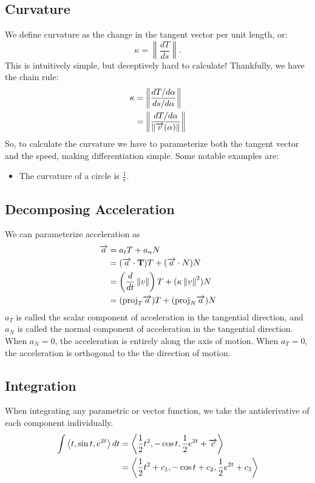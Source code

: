 \documentclass[12pt]{article}
\theoremstyle{plain} %
\theoremstyle{definition}
\theoremstyle{definition}
\theoremstyle{definition}
\theoremstyle{remark}
\newcommand{\vecv}{\vv{v}}
\newcommand{\angled}[1]{\left\langle {#1} \right\rangle}
\newcommand*{\vv}[1]{\overrightarrow{\mkern0mu#1}}
\renewcommand{\norm}[1]{\left\lVert#1\right\rVert}
\newcommand{\ddt}{\frac{d}{dt}}
\begin{document}
\subsection{Curvature}
We define curvature as the change in the tangent vector per unit length, or:
\[ \kappa = \norm{\frac{dT}{ds}}. \]
This is intuitively simple, but deceptively hard to calculate! Thankfully, we have the chain rule:
\begin{align*}
    \kappa & = \norm{\frac{dT/d\alpha}{ds/d\alpha}} \\
    & = \norm{\frac{dT/d\alpha}{\norm{\vecv(\alpha)}}}
\end{align*}
So, to calculate the curvature we have to parameterize both the tangent vector and the speed, making differentiation simple. Some notable examples are:
\begin{itemize}
    \item The curvature of a circle is $\frac{1}{r}$.
\end{itemize}
\subsection{Decomposing Acceleration}
We can parameterize acceleration as
\begin{align*}
\vv{a} &= a_tT + a_nN \\
& = (\vv{a} \cdot \vb{T})T + (\vv{a} \cdot N)N \\
& = \left(\ddt \norm{v}\right)T + (\kappa \norm{v}^2)N \\
& = (\text{proj}_T\vv{a})T + (\text{proj}_N\vv{a})N
\end{align*}
$a_T$ is called the scalar component of acceleration in the tangential direction, and $a_N$ is called the normal component of acceleration in the tangential direction. When $a_N=0$, the acceleration is entirely along the axis of motion. When $a_T=0$, the acceleration is orthogonal to the the direction of motion.

\subsection{Integration}
When integrating any parametric or vector function, we take the antiderivative of each component individually.
\begin{align*}
    \int{\angled{t,\sin{t},e^{2t}}dt} &= \angled{\frac{1}{2}t^2,-\cos{t},\frac{1}{2}e^{2t} + \vv{c}} \\
    &= \angled{\frac{1}{2}t^2+c_1,-\cos{t}+c_2,\frac{1}{2}e^{2t}+c_3}
\end{align*}
\end{document}
